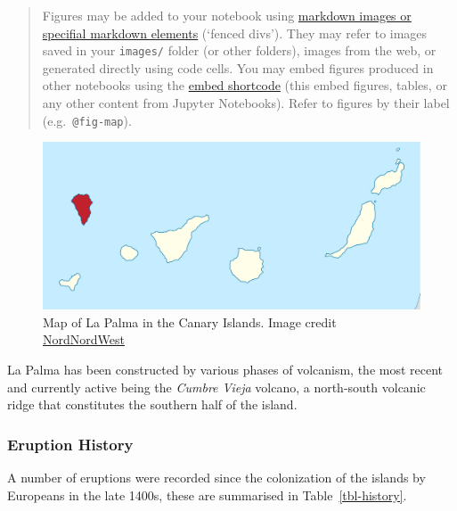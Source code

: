 \documentclass[
]{agujournal2019}
\begin{document}
\begin{quote}
Figures may be added to your notebook using
\href{https://quarto.org/docs/authoring/figures.html}{markdown images or
specifial markdown elements} (`fenced divs'). They may refer to images
saved in your \texttt{images/} folder (or other folders), images from
the web, or generated directly using code cells. You may embed figures
produced in other notebooks using the
\href{https://quarto.org/docs/authoring/notebook-embed.html}{embed
shortcode} (this embed figures, tables, or any other content from
Jupyter Notebooks). Refer to figures by their label
(e.g.~\texttt{@fig-map}).
\end{quote}

\begin{figure}

{\centering \includegraphics[width=1\textwidth,height=\textheight]{images/la-palma-map.png}

}

\caption{\label{fig-map}Map of La Palma in the Canary Islands. Image
credit
\href{https://commons.wikimedia.org/w/index.php?curid=76638603}{NordNordWest}}

\end{figure}

La Palma has been constructed by various phases of volcanism, the most
recent and currently active being the \emph{Cumbre Vieja} volcano, a
north-south volcanic ridge that constitutes the southern half of the
island.

\hypertarget{eruption-history}{%
\subsubsection{Eruption History}\label{eruption-history}}

A number of eruptions were recorded since the colonization of the
islands by Europeans in the late 1400s, these are summarised in
Table~\ref{tbl-history}.
\end{document}
